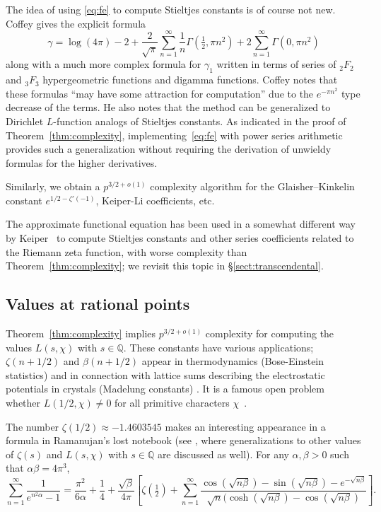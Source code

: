 \documentclass[reqno]{amsart}
\newcommand{\QQ}{\mathbb{Q}}
\newcommand{\be}{\begin{equation}}
\newcommand{\ee}{\end{equation}}
\theoremstyle{definition}
\begin{document}
The idea of using \eqref{eq:fe} to compute Stieltjes constants is of course not new.
Coffey \cite[Proposition 9]{coffey2014series} gives the
explicit formula
\be
\gamma = \log(4 \pi) - 2 + \frac{2}{\sqrt{\pi}} \sum_{n=1}^{\infty} \frac{1}{n} \Gamma(\tfrac{1}{2}, \pi n^2) + 2 \sum_{n=1}^{\infty} \Gamma(0, \pi n^2)
\ee
along with a much more complex formula for $\gamma_1$
written in terms of series of ${}_2F_2$ and ${}_3F_3$
hypergeometric functions and digamma functions.
Coffey notes that these formulas ``may have some attraction for computation''
due to the $e^{-\pi n^2}$ type decrease of the terms.
He also notes that the method can be generalized
to Dirichlet $L$-function analogs of Stieltjes constants.
As indicated in the proof of Theorem~\ref{thm:complexity},
implementing~\eqref{eq:fe} with
power series arithmetic provides such
a generalization without requiring the derivation
of unwieldy formulas for the higher derivatives.

Similarly, we obtain a $p^{3/2+o(1)}$ complexity algorithm
for the Glaisher–Kinkelin constant $e^{1/2-\zeta'(-1)}$,
Keiper-Li coefficients, etc.

The approximate functional equation has been used
in a somewhat different way by Keiper~\cite{Keiper1992power} 
to compute Stieltjes
constants and other series coefficients related
to the Riemann zeta function, with worse
complexity than Theorem~\ref{thm:complexity}; we revisit this topic
in \S \ref{sect:transcendental}.

\subsection{Values at rational points}


Theorem~\ref{thm:complexity} implies $p^{3/2+o(1)}$ complexity for computing
the values $L(s, \chi)$ with $s \in \QQ$.
These constants have various applications;
$\zeta(n+1/2)$ and $\beta(n+1/2)$ appear in thermodynamics (Bose-Einstein statistics)
and in connection
with lattice sums describing the electrostatic potentials in crystals (Madelung constants) \cite[\S 1.10]{finch2003mathematical}.
It is a famous open problem whether $L(1/2, \chi) \ne 0$ for all primitive characters $\chi$~\cite[\S 7.6]{platt2011computing}.

The number $\zeta(1/2) \approx -1.4603545$ makes an interesting appearance
in a formula in Ramanujan's lost notebook (see \cite[\S 8.3]{Andrews2013}, where
generalizations to other values of $\zeta(s)$ and $L(s,\chi)$ with $s \in \QQ$ are discussed as well).
For any $\alpha, \beta > 0$ such that $\alpha \beta = 4 \pi^3$,
\begin{equation}
\sum_{n=1}^{\infty} \frac{1}{e^{n^2 \alpha} - 1} = \frac{\pi^2}{6\alpha} + \frac{1}{4} + \frac{\sqrt{\beta}}{4 \pi} \left[ \zeta(\tfrac{1}{2})
+ \sum_{n=1}^{\infty} \frac{\cos(\sqrt{n \beta}) - \sin(\sqrt{n \beta})  - e^{-\sqrt{n \beta}}}{\sqrt{n} (\cosh(\sqrt{n \beta}) - \cos(\sqrt{n \beta}) } \right].
\end{equation}
\end{document}
